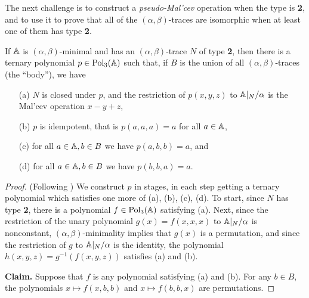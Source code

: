\begin{appendices}
The next challenge is to construct a \emph{pseudo-Mal'cev} operation when the type is \textbf{2}, and to use it to prove that all of the $(\alpha,\beta)$-traces are isomorphic when at least one of them has type \textbf{2}.

\begin{lem}\label{lem-pseudo-malcev} If $\mathbb{A}$ is $(\alpha,\beta)$-minimal and has an $(\alpha,\beta)$-trace $N$ of type \textbf{2}, then there is a ternary polynomial $p \in \operatorname{Pol}_3(\mathbb{A})$ such that, if $B$ is the union of all $(\alpha,\beta)$-traces (the ``body''), we have
\begin{itemize}
\item[(a)] $N$ is closed under $p$, and the restriction of $p(x,y,z)$ to $\mathbb{A}|_N/\alpha$ is the Mal'cev operation $x - y + z$,
\item[(b)] $p$ is idempotent, that is $p(a,a,a) = a$ for all $a \in \mathbb{A}$,
\item[(c)] for all $a \in \mathbb{A}, b \in B$ we have $p(a,b,b) = a$, and
\item[(d)] for all $a \in \mathbb{A}, b \in B$ we have $p(b,b,a) = a$.
\end{itemize}
\end{lem}
\begin{proof} (Following \cite{hobby-mckenzie}) We construct $p$ in stages, in each step getting a ternary polynomial which satisfies one more of (a), (b), (c), (d). To start, since $N$ has type \textbf{2}, there is a polynomial $f \in \operatorname{Pol}_3(\mathbb{A})$ satisfying (a). Next, since the restriction of the unary polynomial $g(x) = f(x,x,x)$ to $\mathbb{A}|_N/\alpha$ is nonconstant, $(\alpha,\beta)$-minimality implies that $g(x)$ is a permutation, and since the restriction of $g$ to $\mathbb{A}|_N/\alpha$ is the identity, the polynomial $h(x,y,z) = g^{-1}(f(x,y,z))$ satisfies (a) and (b).

{\bf Claim.} Suppose that $f$ is any polynomial satisfying (a) and (b). For any $b \in B$, the polynomials $x \mapsto f(x,b,b)$ and $x \mapsto f(b,b,x)$ are permutations.


\end{proof}
\end{appendices}
